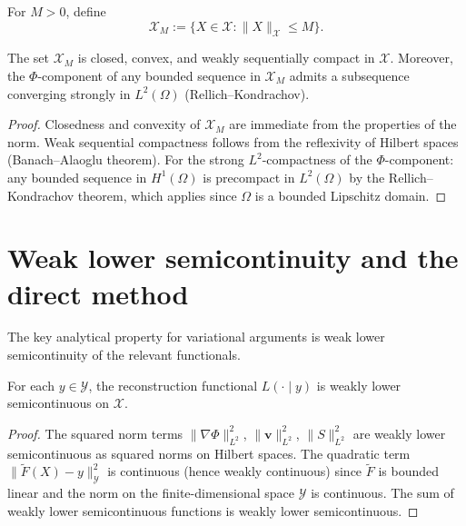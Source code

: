 \documentclass[12pt, oneside]{memoir}
\newcommand{\X}{\mathcal{X}}
\newcommand{\Ft}{\widetilde{F}}
\newcommand{\nnorm}[1]{\lVert #1 \rVert}
\newcommand{\bv}{\mathbf{v}}
\begin{document}
\begin{definition}
\label{def:XM}
For $M > 0$, define
\[
  \X_M := \{X \in \X : \nnorm{X}_\X \le M\}.
\]
\end{definition}

\begin{proposition}[Compactness of $\X_M$]
\label{prop:XM-compact}
The set $\X_M$ is closed, convex, and weakly sequentially compact in $\X$.  Moreover,
the $\Phi$-component of any bounded sequence in $\X_M$ admits a subsequence converging
strongly in $L^2(\Omega)$ (Rellich--Kondrachov).
\end{proposition}

\begin{proof}
Closedness and convexity of $\X_M$ are immediate from the properties of the norm.  Weak
sequential compactness follows from the reflexivity of Hilbert spaces (Banach--Alaoglu
theorem).  For the strong $L^2$-compactness of the $\Phi$-component: any bounded
sequence in $H^1(\Omega)$ is precompact in $L^2(\Omega)$ by the Rellich--Kondrachov
theorem, which applies since $\Omega$ is a bounded Lipschitz domain.
\end{proof}

\section{Weak lower semicontinuity and the direct method}

The key analytical property for variational arguments is weak lower semicontinuity of
the relevant functionals.

\begin{proposition}
\label{prop:wlsc}
For each $y \in \mathcal{Y}$, the reconstruction functional $L(\cdot \mid y)$ is weakly
lower semicontinuous on $\X$.
\end{proposition}

\begin{proof}
The squared norm terms $\nnorm{\nabla\Phi}_{L^2}^2$, $\nnorm{\bv}_{L^2}^2$,
$\nnorm{S}_{L^2}^2$ are weakly lower semicontinuous as squared norms on Hilbert spaces.
The quadratic term $\nnorm{\Ft(X) - y}_{\mathcal{Y}}^2$ is continuous (hence weakly
continuous) since $\Ft$ is bounded linear and the norm on the finite-dimensional space
$\mathcal{Y}$ is continuous.  The sum of weakly lower semicontinuous functions is weakly
lower semicontinuous.
\end{proof}
\end{document}
